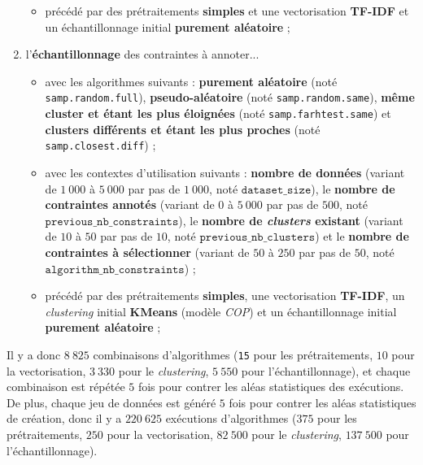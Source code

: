 \begin{enumerate}
\begin{itemize}
						\item précédé par des prétraitements \textbf{simples} et une vectorisation \textbf{TF-IDF} et un échantillonnage initial \textbf{purement aléatoire} ;
					\end{itemize}
				\item l'\textbf{échantillonnage} des contraintes à annoter...
					\begin{itemize}
						\item avec les algorithmes suivants : \textbf{purement aléatoire} (noté \texttt{samp.random.full}), \textbf{pseudo-aléatoire} (noté \texttt{samp.random.same}), \textbf{même cluster et étant les plus éloignées} (noté \texttt{samp.farhtest.same}) et \textbf{clusters différents et étant les plus proches} (noté \texttt{samp.closest.diff}) ;
						\item avec les contextes d'utilisation suivants : \textbf{nombre de données} (variant de $1~000$ à $5~000$ par pas de $1~000$, noté $\texttt{dataset\_size}$), le \textbf{nombre de contraintes annotés} (variant de $0$ à $5~000$ par pas de $500$, noté $\texttt{previous\_nb\_constraints}$), le \textbf{nombre de \textit{clusters} existant} (variant de $10$ à $50$ par pas de $10$, noté $\texttt{previous\_nb\_clusters}$) et le \textbf{nombre de contraintes à sélectionner} (variant de $50$ à $250$ par pas de $50$, noté $\texttt{algorithm\_nb\_constraints}$) ;
						\item précédé par des prétraitements \textbf{simples}, une vectorisation \textbf{TF-IDF}, un \textit{clustering} initial \textbf{KMeans} (modèle \textit{COP}) et un échantillonnage initial \textbf{purement aléatoire} ;
					\end{itemize}
			\end{enumerate}
			
			Il y a donc $8~825$ combinaisons d'algorithmes (\texttt{15} pour les prétraitements, $10$ pour la vectorisation, $3~330$ pour le \textit{clustering}, $5~550$ pour l'échantillonnage), et chaque combinaison est répétée $5$ fois pour contrer les aléas statistiques des exécutions.
			De plus, chaque jeu de données est généré $5$ fois pour contrer les aléas statistiques de création, donc il y a $220~625$ exécutions d'algorithmes ($375$ pour les prétraitements, $250$ pour la vectorisation, $82~500$ pour le \textit{clustering}, $137~500$ pour l'échantillonnage).
			
